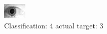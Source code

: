 \begin{figure}[h!]
\begin{center}
\includegraphics[width=0.60\columnwidth]{figures/ID1951_class_4_target_3.png}
\end{center}
\caption{ Classification: 4 actual target: 3}
\label{fig:ID1951_class_4_target_3}
\end{figure}
